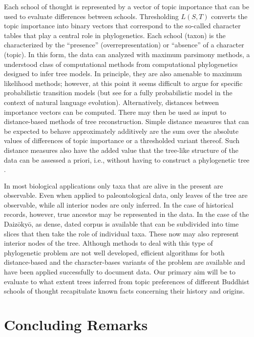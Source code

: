 \documentclass[a4paper,10pt]{article}
\begin{document}
Each school of thought is represented by a vector of topic importance that
can be used to evaluate differences between schools. Thresholding $L(S,T)$
converts the topic importance into binary vectors that correspond to the
so-called character tables that play a central role in phylogenetics. Each
school (taxon) is the characterized by the ``presence''
(overrepresentation) or ``absence'' of a character (topic).  In this form,
the data can analyzed with maximum parsimony methods, a understood class of
computational methods from computational phylogenetics designed to infer
tree models. In principle, they are also amenable to maximum likelihood
methods; however, at this point it seems difficult to argue for specific
probabilistic transition models (but see \cite{Hruschka:15} for a fully
probabilistic model in the context of natural language
evolution). Alternatively, distances between importance vectors can be
computed. There may then be used as input to distance-based methods of tree
reconstruction. Simple distance measures that can be expected to behave
approximately additively are the sum over the absolute values of
differences of topic importance or a thresholded variant thereof. Such
distance measures also have the added value that the tree-like structure of
the data can be assessed a priori, i.e., without having to construct a
phylogenetic tree \cite{Misof:14}.

In most biological applications only taxa that are alive in the present are
observable. Even when applied to paleontological data, only leaves of the
tree are observable, while all interior nodes are only inferred. In the
case of historical records, however, true ancestor may be represented in
the data. In the case of the Daiz{\=o}ky{\=o}, as dense, dated corpus is
available that can be subdivided into time slices that then take the role
of individual taxa. These now may also represent interior nodes of the
tree. Although methods to deal with this type of phylogenetic problem are
not well developed, efficient algorithms for both distance-based and the
character-bases variants of the problem are available \cite{Telles:13} and
have been applied successfully to document data. Our primary aim will
  be to evaluate to what extent trees inferred from topic preferences of
  different Buddhist schools of thought recapitulate known facts concerning
  their history and origins.

\section{Concluding Remarks} 
\end{document}
